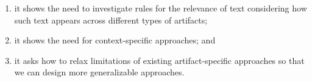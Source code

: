 \begin{enumerate}
    \item it shows the need to investigate rules for the relevance of text 
    considering how such text appears across different types of artifacts;
    \item it shows the need for context-specific approaches; and 
    \item it asks how to relax limitations of existing
    artifact-specific approaches so that we can design 
    more generalizable approaches. 
\end{enumerate}


